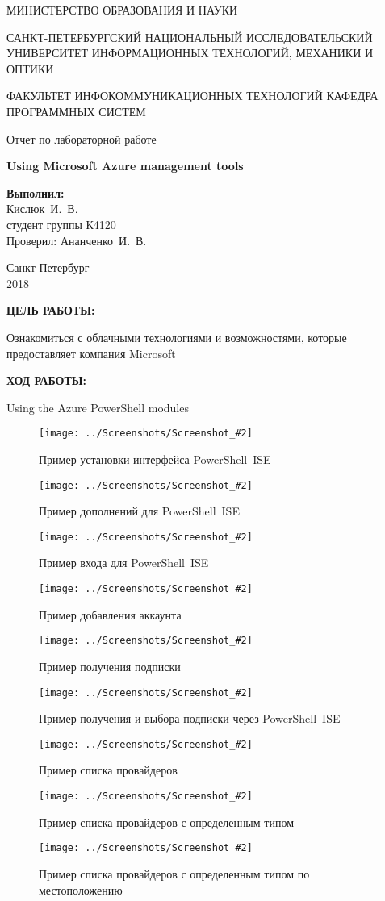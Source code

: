 \documentclass[14pt,a4paper]{extreport}
\newcommand{\screenshot}[2]{\begin{figure}[ht]%
\centering\texttt{[image: ../Screenshots/Screenshot\_\#2]}%
\caption{#1}%
\label{picture#2}%
\end{figure}%
}
\newcommand{\header}[1]{%
{
\fontsize{16pt}{14pt}\selectfont
\begin{center}
\textbf{\MakeUppercase{#1}:}
\end{center}
}
}
\newcommand{\prepod}{Ананченко~И.~В.}
\newcommand{\igork}{Кислюк~И.~В.}
\newcommand{\pse}{PowerShell~ISE}
\begin{document}
	\begin{titlepage}
	\begin{center}	
		\fontsize{14pt}{14pt}\selectfont
		МИНИСТЕРСТВО ОБРАЗОВАНИЯ И НАУКИ\\

		\vspace*{0.6\baselineskip}
		
		САНКТ-ПЕТЕРБУРГСКИЙ НАЦИОНАЛЬНЫЙ ИССЛЕДОВАТЕЛЬСКИЙ УНИВЕРСИТЕТ ИНФОРМАЦИОННЫХ ТЕХНОЛОГИЙ, МЕХАНИКИ И ОПТИКИ
		
		\vspace*{0.6\baselineskip}
		ФАКУЛЬТЕТ ИНФОКОММУНИКАЦИОННЫХ ТЕХНОЛОГИЙ
		КАФЕДРА ПРОГРАММНЫХ СИСТЕМ
	
		\vspace*{7\baselineskip}
		\fontsize{19pt}{18pt}\selectfont
		Отчет по лабораторной работе
		
		\fontsize{20pt}{18pt}\selectfont
		\textbf{Using Microsoft Azure management tools}\\
		\vspace*{1.15\baselineskip}
		\end{center}
	
	\vspace*{2\baselineskip}
	\begin{flushright}
	\fontsize{14pt}{14pt}\selectfont
	\textbf{Выполнил:}\\
	\igork\\
	студент группы К4120\\
	Проверил: \prepod\\
	\end{flushright}
	
	\vspace{\fill}
	\begin{center}
	Санкт-Петербург\\
	2018
	\end{center}
	
\end{titlepage}

\newpage

\header{Цель работы}

\fontsize{14pt}{14pt}\selectfont

Ознакомиться с облачными технологиями и возможностями, которые предоставляет компания Microsoft
\clearpage

\header{Ход работы}

Using the Azure PowerShell modules
\screenshot{Пример установки интерфейса \pse}{1}
\screenshot{Пример дополнений для \pse}{2}
\screenshot{Пример входа для \pse}{3}
\screenshot{Пример добавления аккаунта}{4}
\screenshot{Пример получения подписки}{5}
\screenshot{Пример получения и выбора подписки через \pse}{6}
\screenshot{Пример списка провайдеров}{7}
\screenshot{Пример списка провайдеров с определенным типом}{8}
\screenshot{Пример списка провайдеров с определенным типом по местоположению}{9}
\end{document}
